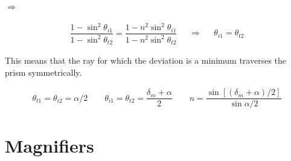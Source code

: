 $\Rightarrow $

\begin{equation*}
  \begin{aligned}
    \dfrac{1 - \sin^2 \theta_{i1}}{1 - \sin^2 \theta_{t2}} = \dfrac{1 - n^2 \sin^2 \theta_{i1}}{1 - n^2 \sin^2 \theta_{t2}}  
  \end{aligned}
  \quad \Rightarrow \quad 
  \begin{aligned}
    \theta_{i1} = \theta_{t2}
  \end{aligned}
\end{equation*}

This means that the ray for which the deviation is a minimum traverses the prism symmetrically.

\begin{equation*}
  \begin{aligned}
    \theta_{t1} = \theta_{i2} = \alpha / 2 \quad\quad \theta_{i1} = \theta_{t2} = \dfrac{\delta_m + \alpha}{2} \quad\quad n = \dfrac{\sin \left[ \left( \delta_m + \alpha \right) / 2 \right]}{\sin \alpha / 2}  
  \end{aligned}
\end{equation*}

\section{Magnifiers}

